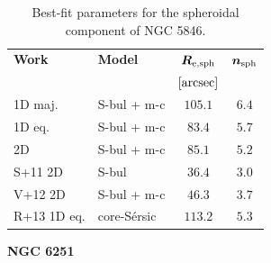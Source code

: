 \documentclass[preprint2]{emulateapj}
\begin{document}
  \begin{table}[h]
  \small
  \caption{Best-fit parameters for the spheroidal component of NGC 5846.}
  \begin{center}
  \begin{tabular}{llcc}
  \hline
  {\bf Work} & {\bf Model}   & $\bm R_{\rm e,sph}$    & $\bm n_{\rm sph}$ \\
    &  &  $[\rm arcsec]$ & \\
  \hline
  1D maj. & S-bul + m-c & $105.1$  &  $6.4$ \\
  1D eq.  & S-bul + m-c & $83.4$	&  $5.7$ \\
  2D      & S-bul + m-c & $85.1$	&  $5.2$ \\
  \hline
  S+11 2D      & S-bul	    & $36.4$   &  $3.0$ \\
  V+12 2D      & S-bul + m-c   & $46.3$   &  $3.7$ \\
  R+13 1D eq.      & core-S\'ersic & $113.2$  &  $5.3$ \\
  \hline
  \end{tabular}
  \end{center}
  \label{tab:n5846}
  \end{table}

  \clearpage\newpage\noindent
  {\bf NGC 6251 \\}
\end{document}
